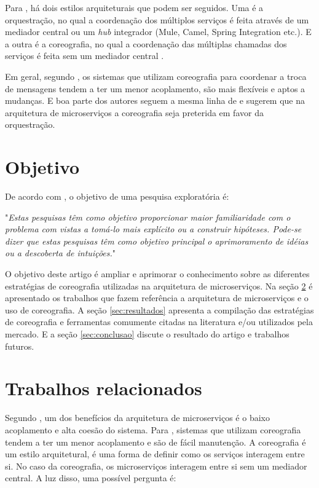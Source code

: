 \documentclass[12pt]{article}
\theoremstyle{plain}
\begin{document}
 Para \cite{Newman:15}, há dois estilos arquiteturais que podem ser seguidos. Uma é a orquestração, no qual a coordenação dos múltiplos serviços é feita através de um mediador central ou um \textit{hub} integrador (Mule, Camel, Spring Integration etc.). E a outra é a coreografia, no qual a coordenação das múltiplas chamadas dos serviços é feita sem um mediador central \cite{richards:15, Newman:15}. 

Em geral, segundo \cite{Newman:15}, os sistemas que utilizam coreografia para coordenar a troca de mensagens tendem a ter um menor acoplamento, são mais flexíveis e aptos a mudanças. E boa parte dos autores \cite{wolf:2018, Dragoni2017, richards:15, Alshuqayran:2016, martinfowler-microservices:2014} seguem a mesma linha de \cite{Newman:15} e sugerem que na arquitetura de microserviços a coreografia seja preterida em favor da orquestração.

\section{Objetivo} \label{sec:firstpage}

De acordo com \cite{gil:17}, o objetivo de uma pesquisa exploratória é:

"\emph{Estas pesquisas têm como objetivo proporcionar maior familiaridade com o problema com vistas a
tomá-lo mais explícito ou a construir hipóteses. Pode-se dizer que estas pesquisas têm como
objetivo principal o aprimoramento de idéias ou a descoberta de intuições.}"

O objetivo deste artigo é ampliar e aprimorar o conhecimento sobre as diferentes estratégias de coreografia utilizadas na arquitetura de microserviços. Na seção \ref{sec:trabalhos-relacionados} é apresentado os trabalhos que fazem referência a arquitetura de microserviços e o uso de coreografia. A seção \ref{sec:resultados} apresenta a compilação das estratégias de coreografia e ferramentas comumente citadas na literatura e/ou utilizados pela mercado. E a seção \ref{sec:conclusao} discute o resultado do artigo e trabalhos futuros.

\section{Trabalhos relacionados}
\label{sec:trabalhos-relacionados}

Segundo \cite{wolf:2018}, um dos benefícios da arquitetura de microserviços é o baixo acoplamento e alta coesão do sistema. Para \cite{Newman:15}, sistemas que utilizam coreografia tendem a ter um menor acoplamento e são de fácil manutenção. A coreografia é um estilo arquitetural, é uma forma de definir como os serviços interagem entre si. No caso da coreografia, os microserviços interagem entre si sem um mediador central. A luz disso, uma possível pergunta é:
\end{document}
